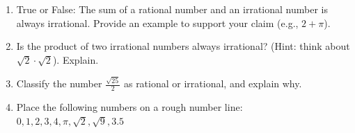 \documentclass[12pt, letterpaper, fleqn]{article}
\begin{document}
\vspace{3mm}

\begin{enumerate}[itemsep=4.2cm, leftmargin=0.6cm, resume]
\item True or False: The sum of a rational number and an irrational number is always irrational. Provide an example to support your claim (e.g., $2 + \pi$).
\item Is the product of two irrational numbers always irrational? (Hint: think about $\sqrt{2} \cdot \sqrt{2}$). Explain.
\item Classify the number $\frac{\sqrt{25}}{2}$ as rational or irrational, and explain why.
\item Place the following numbers on a rough number line: $0, 1, 2, 3, 4, \pi, \sqrt{2}, \sqrt{9}, 3.5$
\end{enumerate}
\end{document}
